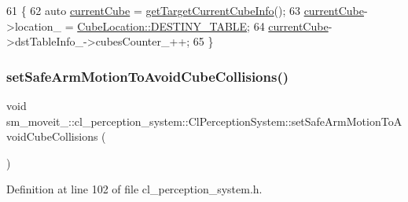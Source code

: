 \begin{DoxyCode}
61             \{
62                 \textcolor{keyword}{auto} \hyperlink{classsm__moveit__4_1_1cl__perception__system_1_1ClPerceptionSystem_ae2a80b803814af8b3c87f810f2728af0}{currentCube} = \hyperlink{classsm__moveit__4_1_1cl__perception__system_1_1ClPerceptionSystem_ac4b944cebb2055a85a33129665df5dcf}{getTargetCurrentCubeInfo}();
63                 \hyperlink{classsm__moveit__4_1_1cl__perception__system_1_1ClPerceptionSystem_ae2a80b803814af8b3c87f810f2728af0}{currentCube}->location\_ = \hyperlink{namespacesm__moveit__4_1_1cl__perception__system_a0d1b8834532a7cf9d19670791eece6d1acdc3fdda18904b4a1ac0be036c86f973}{CubeLocation::DESTINY\_TABLE};
64                 \hyperlink{classsm__moveit__4_1_1cl__perception__system_1_1ClPerceptionSystem_ae2a80b803814af8b3c87f810f2728af0}{currentCube}->dstTableInfo\_->cubesCounter\_++;
65             \}
\end{DoxyCode}
\mbox{\label{classsm__moveit__4_1_1cl__perception__system_1_1ClPerceptionSystem_a5304dc8734488564093525dfe4f4bcd1}} 
\subsubsection{\texorpdfstring{set\+Safe\+Arm\+Motion\+To\+Avoid\+Cube\+Collisions()}{setSafeArmMotionToAvoidCubeCollisions()}}
{\footnotesize\ttfamily void sm\+\_\+moveit\+\_\+::cl\+\_\+perception\+\_\+system\+::\+Cl\+Perception\+System\+::set\+Safe\+Arm\+Motion\+To\+Avoid\+Cube\+Collisions (\begin{DoxyParamCaption}{ }\end{DoxyParamCaption})\hspace{0.3cm}{\ttfamily [inline]}}



Definition at line 102 of file cl\+\_\+perception\+\_\+system.\+h.



